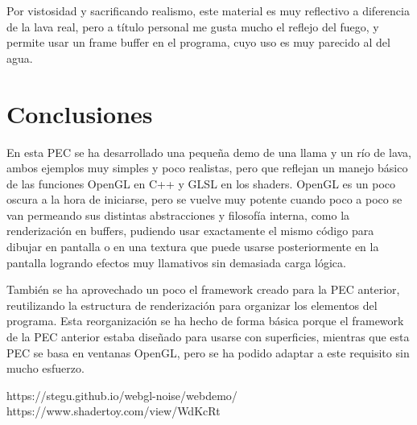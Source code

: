 \documentclass[12pt]{article}%
\begin{document}
	Por vistosidad y sacrificando realismo, este material es muy reflectivo a diferencia de la lava real, pero a título personal me gusta mucho el reflejo del fuego, y permite usar un frame buffer en el programa, cuyo uso es muy parecido al del agua.
	

	
	
\section{Conclusiones}
	En esta PEC se ha desarrollado una pequeña demo de una llama y un río de lava, ambos ejemplos muy simples y poco realistas, pero que reflejan un manejo básico de las funciones OpenGL en C++ y GLSL en los shaders. OpenGL es un poco oscura a la hora de iniciarse, pero se vuelve muy potente cuando poco a poco se van permeando sus distintas abstracciones y filosofía interna, como la renderización en buffers, pudiendo usar exactamente el mismo código para dibujar en pantalla o en una textura que puede usarse posteriormente en la pantalla logrando efectos muy llamativos sin demasiada carga lógica.
	
	También se ha aprovechado un poco el framework creado para la PEC anterior, reutilizando la estructura de renderización para organizar los elementos del programa. Esta reorganización se ha hecho de forma básica porque el framework de la PEC anterior estaba diseñado para usarse con superficies, mientras que esta PEC se basa en ventanas OpenGL, pero se ha podido adaptar a este requisito sin mucho esfuerzo.
	
	
\begin{thebibliography}{9}
 https://stegu.github.io/webgl-noise/webdemo/
 https://www.shadertoy.com/view/WdKcRt
\end{thebibliography}
\end{document}
